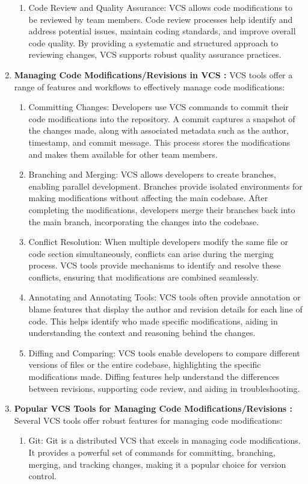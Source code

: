 \begin{enumerate}
\begin{enumerate}
        \item Code Review and Quality Assurance: VCS allows code modifications to be reviewed by team members. Code review processes help identify and address potential issues, maintain coding standards, and improve overall code quality. By providing a systematic and structured approach to reviewing changes, VCS supports robust quality assurance practices.
    \end{enumerate}
    \item \textbf{Managing Code Modifications/Revisions in VCS : }VCS tools offer a range of features and workflows to effectively manage code modifications:
    \begin{enumerate}
        \item Committing Changes: Developers use VCS commands to commit their code modifications into the repository. A commit captures a snapshot of the changes made, along with associated metadata such as the author, timestamp, and commit message. This process stores the modifications and makes them available for other team members.
        \item Branching and Merging: VCS allows developers to create branches, enabling parallel development. Branches provide isolated environments for making modifications without affecting the main codebase. After completing the modifications, developers merge their branches back into the main branch, incorporating the changes into the codebase.
        \item Conflict Resolution: When multiple developers modify the same file or code section simultaneously, conflicts can arise during the merging process. VCS tools provide mechanisms to identify and resolve these conflicts, ensuring that modifications are combined seamlessly.
        \item Annotating and Annotating Tools: VCS tools often provide annotation or blame features that display the author and revision details for each line of code. This helps identify who made specific modifications, aiding in understanding the context and reasoning behind the changes.
        \item Diffing and Comparing: VCS tools enable developers to compare different versions of files or the entire codebase, highlighting the specific modifications made. Diffing features help understand the differences between revisions, supporting code review, and aiding in troubleshooting.
    \end{enumerate}
    \item \textbf{Popular VCS Tools for Managing Code Modifications/Revisions : }Several VCS tools offer robust features for managing code modifications:
    \begin{enumerate}
        \item Git: Git is a distributed VCS that excels in managing code modifications. It provides a powerful set of commands for committing, branching, merging, and tracking changes, making it a popular choice for version control.


\end{enumerate}
\end{enumerate}

